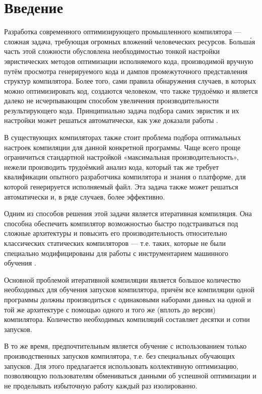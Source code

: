 \chapter{Введение}
Разработка современного оптимизирующего промышленного компилятора --- сложная задача, требующая огромных вложений человеческих ресурсов. Больш\'{а}я часть этой сложности обусловлена необходимостью тонкой настройки эвристических методов оптимизации исполняемого кода, производимой вручную путём просмотра генерируемого кода и дампов промежуточного представления структур компилятора. Более того, сами правила обнаружения случаев, в которых можно оптимизировать код, создаются человеком, что также трудоёмко и является далеко не исчерпывающим способом увеличения производительности результирующего кода. Принципиально задача подбора самих эвристик и их настройки может решаться автоматически, как уже доказали работы \cite{Agakov:2006:UML:1121992.1122412,Bodin98iterativecompilation,FCA2007,Cooper:2005:AAC:1065910.1065921}.

В существующих компиляторах также стоит проблема подбора оптимальных настроек компиляции для данной конкретной программы. Чаще всего проще ограничиться стандартной настройкой «максимальная производительность», нежели производить трудоёмкий анализ кода, который так же требует квалификации опытного разработчика компилятора и знания о платформе, для которой генерируется исполняемый файл. Эта задача также может решаться автоматически и, в ряде случаев, более эффективно.

Одним из способов решения этой задачи является итеративная компиляция. Она способна обеспечить компилятор возможностью быстро подстраиваться под сложные архитектуры и повысить его производительность относительно классических статических компиляторов — т.е. таких, которые не были специально модифицированы для работы с инструментарием машинного обучения \cite{Dubach:2009:PCO:1669112.1669124,Dubach:2008:EPA:1450095.1450103}.

Основной проблемой итеративной компиляции является большое количество необходимых для обучения запусков компилятора, причём все компиляции одной программы должны производиться с одинаковыми наборами данных на одной и той же архитектуре с помощью одного и того же (вплоть до версии) компилятора. Количество необходимых компиляций составляет десятки и сотни запусков.

В то же время, предпочтительным является обучение с использованием только производственных запусков компилятора, т.е. без специальных обучающих запусков. Для этого предлагается использовать коллективную оптимизацию, позволяющую пользователям обмениваться данными об успешной оптимизации и не проделывать избыточную работу каждый раз изолированно.

